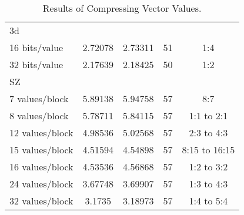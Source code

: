\begin{table}
\begin{tabular}{l|S[table-format=2.6]|S[table-format=2.6]|r|c}
		\hspace{3mm} 3d & & & & \\
			\hspace{6mm} 16 bits/value & 2.72078 & 2.73311 & 51 & 1:4 \\
			\hspace{6mm} 32 bits/value & 2.17639 & 2.18425 & 50 & 1:2 \\
		SZ & & & & \\
		\hspace{3mm} 7 values/block & 5.89138 & 5.94758 & 57 & 8:7 \\
		\hspace{3mm} 8 values/block & 5.78711 & 5.84115 & 57 & 1:1 to 2:1 \\
		\hspace{3mm} 12 values/block & 4.98536 & 5.02568 & 57 & 2:3 to 4:3 \\
		\hspace{3mm} 15 values/block & 4.51594 & 4.54898 & 57 & 8:15 to 16:15 \\
		\hspace{3mm} 16 values/block & 4.53536 & 4.56868 & 57 & 1:2 to 3:2 \\
		\hspace{3mm} 24 values/block & 3.67748 & 3.69907 & 57 & 1:3 to 4:3\\
		\hspace{3mm} 32 values/block & 3.1735 & 3.18973 & 57 & 1:4 to 5:4\\
	\end{tabular}
	\caption{Results of Compressing Vector Values.}
	\label{tab:results-vec}
\end{table}
